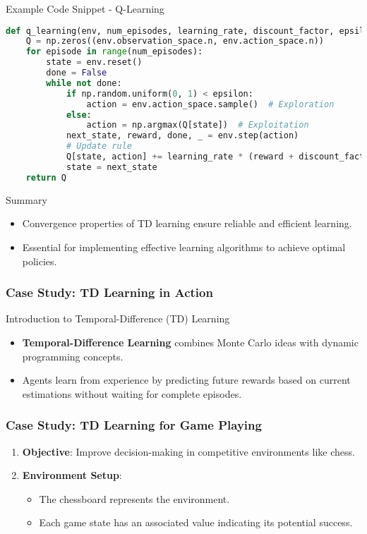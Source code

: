 \documentclass[aspectratio=169]{beamer}
\begin{document}
\begin{frame}[fragile]{Example Code Snippet - Q-Learning}
    \begin{lstlisting}[language=Python]
def q_learning(env, num_episodes, learning_rate, discount_factor, epsilon):
    Q = np.zeros((env.observation_space.n, env.action_space.n))
    for episode in range(num_episodes):
        state = env.reset()
        done = False
        while not done:
            if np.random.uniform(0, 1) < epsilon:
                action = env.action_space.sample()  # Exploration
            else:
                action = np.argmax(Q[state])  # Exploitation
            next_state, reward, done, _ = env.step(action)
            # Update rule
            Q[state, action] += learning_rate * (reward + discount_factor * np.max(Q[next_state]) - Q[state, action])
            state = next_state
    return Q
    \end{lstlisting}
\end{frame}

\begin{frame}[fragile]{Summary}
    \begin{itemize}
        \item Convergence properties of TD learning ensure reliable and efficient learning.
        \item Essential for implementing effective learning algorithms to achieve optimal policies.
    \end{itemize}
\end{frame}

\begin{frame}[fragile]
    \frametitle{Case Study: TD Learning in Action}
    \begin{block}{Introduction to Temporal-Difference (TD) Learning}
        \begin{itemize}
            \item \textbf{Temporal-Difference Learning} combines Monte Carlo ideas with dynamic programming concepts.
            \item Agents learn from experience by predicting future rewards based on current estimations without waiting for complete episodes.
        \end{itemize}
    \end{block}
\end{frame}

\begin{frame}[fragile]
    \frametitle{Case Study: TD Learning for Game Playing}
    \begin{enumerate}
        \item \textbf{Objective}: Improve decision-making in competitive environments like chess.
        \item \textbf{Environment Setup}:
            \begin{itemize}
                \item The chessboard represents the environment.
                \item Each game state has an associated value indicating its potential success.
            \end{itemize}
    \end{enumerate}
\end{frame}
\end{document}
